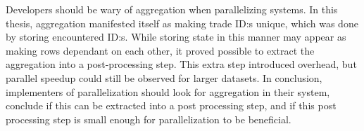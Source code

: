 Developers should be wary of aggregation when parallelizing systems. In this thesis, aggregation manifested itself as making trade ID:s unique,
which was done by storing encountered ID:s. While storing state in this manner may appear as making rows dependant on each other, it proved
possible to extract the aggregation into a post-processing step. This extra step introduced overhead, but parallel speedup could still be 
observed for larger datasets. In conclusion, implementers of parallelization should look for aggregation in their system, conclude if this
can be extracted into a post processing step, and if this post processing step is small enough for parallelization to be beneficial.

